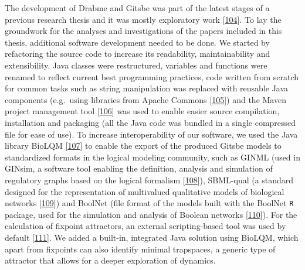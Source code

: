 \documentclass[
  12pt,
]{book}
\begin{document}
The development of Drabme and Gitsbe was part of the latest stages of a previous research thesis and it was mostly exploratory work {[}\protect\hyperlink{ref-Flobak2016}{104}{]}.
To lay the groundwork for the analyses and investigations of the papers included in this thesis, additional software development needed to be done.
We started by refactoring the source code to increase its readability, maintainability and extensibility.
Java classes were restructured, variables and functions were renamed to reflect current best programming practices, code written from scratch for common tasks such as string manipulation was replaced with reusable Java components (e.g.~using libraries from Apache Commons {[}\protect\hyperlink{ref-ApacheCommons}{105}{]}) and the Maven project management tool {[}\protect\hyperlink{ref-Maven}{106}{]} was used to enable easier source compilation, installation and packaging (all the Java code was bundled in a single compressed file for ease of use).
To increase interoperability of our software, we used the Java library BioLQM {[}\protect\hyperlink{ref-Naldi2018}{107}{]} to enable the export of the produced Gitsbe models to standardized formats in the logical modeling community, such as GINML (used in GINsim, a software tool enabling the definition, analysis and simulation of regulatory graphs based on the logical formalism {[}\protect\hyperlink{ref-Naldi2018b}{108}{]}), SBML-qual (a standard designed for the representation of multivalued qualitative models of biological networks {[}\protect\hyperlink{ref-Chaouiya2013}{109}{]}) and BoolNet (file format of the models built with the BoolNet \texttt{R} package, used for the simulation and analysis of Boolean networks {[}\protect\hyperlink{ref-Mussel2010}{110}{]}).
For the calculation of fixpoint attractors, an external scripting-based tool was used by default {[}\protect\hyperlink{ref-Veliz-Cuba2014}{111}{]}.
We added a built-in, integrated Java solution using BioLQM, which apart from fixpoints can also identify minimal trapspaces, a generic type of attractor that allows for a deeper exploration of dynamics.
\end{document}

